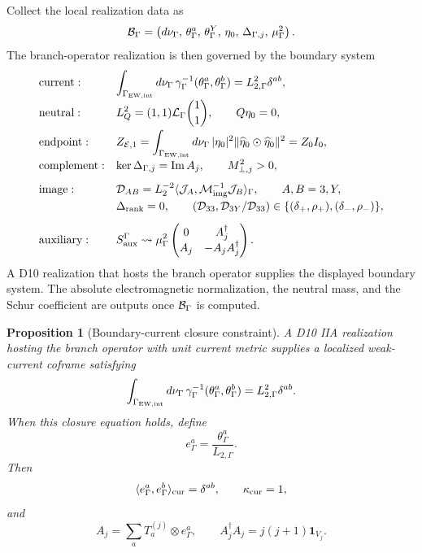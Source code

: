 \documentclass[11pt]{article}
\newtheorem{proposition}{Proposition}
\theoremstyle{definition}
\theoremstyle{remark}
\begin{document}
Collect the local realization data as
\[
  {\cal B}_\Gamma
  =
  \left(
  d\nu_\Gamma,\,
  \theta_\Gamma^a,\,
  \theta_\Gamma^Y,\,
  \eta_0,\,
  \Delta_{\Gamma,j},\,
  \mu_\Gamma^2
  \right).
\]
The branch-operator realization is then governed by the boundary system
\[
\begin{array}{ll}
{\rm current:}&
\displaystyle
\int_{\Gamma_{\rm EW,int}}d\nu_\Gamma\,
\gamma_\Gamma^{-1}(\theta_\Gamma^a,\theta_\Gamma^b)
=L_{2,\Gamma}^2\delta^{ab},
\\[3mm]
{\rm neutral:}&
\displaystyle
L_Q^2=(1,1){\cal L}_\Gamma\binom{1}{1},
\qquad
Q\eta_0=0,
\\[3mm]
{\rm endpoint:}&
\displaystyle
Z_{\mathcal E,1}
=
\int_{\Gamma_{\rm EW,int}}d\nu_\Gamma\,|\eta_0|^2
\|\widehat\eta_0\odot\widehat\eta_0\|^2
=Z_0I_0,
\\[3mm]
{\rm complement:}&
\displaystyle
\ker\Delta_{\Gamma,j}={\rm Im}\,A_j,
\qquad
M_{\perp,j}^2>0,
\\[3mm]
{\rm image:}&
\displaystyle
{\cal D}_{AB}
=
L_2^{-2}
\langle{\cal J}_A,{\cal M}_{\rm img}^{-1}{\cal J}_B\rangle_\Gamma,
\qquad A,B=3,Y,
\\[1mm]
&
\displaystyle
\Delta_{\rm rank}=0,\qquad
({\cal D}_{33},{\cal D}_{3Y}/{\cal D}_{33})
\in
\{(\delta_+,\rho_+),(\delta_-,\rho_-)\},
\\[3mm]
{\rm auxiliary:}&
\displaystyle
S_{\rm aux}^{\Gamma}
\leadsto
\mu_\Gamma^2
\begin{pmatrix}
0&A_j^\dagger\\
A_j&-A_jA_j^\dagger
\end{pmatrix}.
\end{array}
\]
A D10 realization that hosts the branch operator supplies the displayed
boundary system.  The absolute electromagnetic normalization, the neutral
mass, and the Schur coefficient are outputs once \({\cal B}_\Gamma\) is
computed.

\begin{proposition}[Boundary-current closure constraint]
\label{prop:d10currentunit}
A D10 IIA realization hosting the branch operator with unit current metric
supplies a localized weak-current coframe satisfying
\[
  \int_{\Gamma_{\rm EW,int}}d\nu_\Gamma\,
  \gamma_\Gamma^{-1}(\theta_\Gamma^a,\theta_\Gamma^b)
  =
  L_{2,\Gamma}^2\delta^{ab}.
\]
When this closure equation holds, define
\[
  e_\Gamma^a=\frac{\theta_\Gamma^a}{L_{2,\Gamma}}.
\]
Then
\[
  \langle e_\Gamma^a,e_\Gamma^b\rangle_{\rm cur}=\delta^{ab},
  \qquad
  \kappa_{\rm cur}=1,
\]
and
\[
  A_j=\sum_aT_a^{(j)}\otimes e_\Gamma^a,
  \qquad
  A_j^\dagger A_j=j(j+1)\bm1_{V_j}.
\]
\end{proposition}
\end{document}
